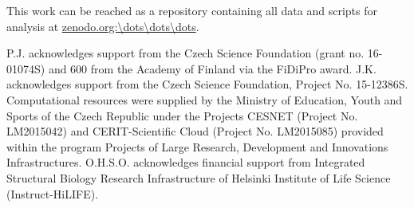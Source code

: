 \documentclass[aip,jcp,twocolumn]{revtex4}
\begin{document}
This work can be reached as a repository containing all data and scripts for analysis at \url{zenodo.org:\dots\dots\dots}.


\begin{acknowledgments}
P.J. acknowledges support from the Czech Science Foundation (grant no. 16-01074S) 
and 600 from the Academy of Finland via the FiDiPro award.
J.K. acknowledges support from the Czech Science Foundation, Project No. 15-12386S.
Computational resources were supplied by the Ministry of Education, Youth and Sports
of the Czech Republic under the Projects CESNET (Project No. LM2015042) and CERIT-Scientific
Cloud (Project No. LM2015085) provided within the program Projects of Large Research,
Development and Innovations Infrastructures.
O.H.S.O. acknowledges financial support from
Integrated Structural Biology Research Infrastructure of
Helsinki Institute of Life Science (Instruct-HiLIFE).
\end{acknowledgments}




\listoftodos
\end{document}
